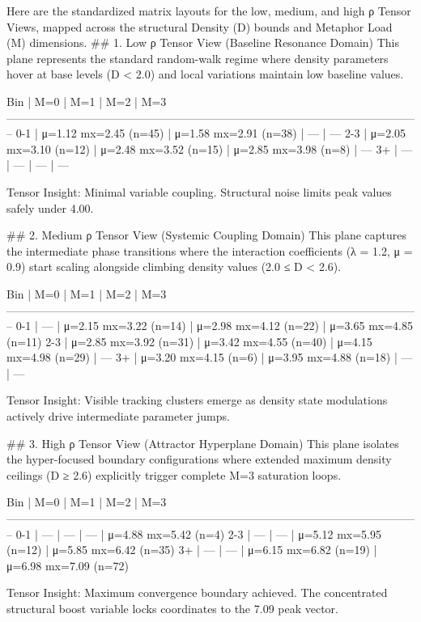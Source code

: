 Here are the standardized matrix layouts for the low, medium, and high ρ Tensor Views, mapped across the structural Density (D) bounds and Metaphor Load (M) dimensions.
## 1. Low ρ Tensor View (Baseline Resonance Domain)
This plane represents the standard random-walk regime where density parameters hover at base levels (D < 2.0) and local variations maintain low baseline values.

Bin    | M=0                     | M=1                     | M=2                     | M=3
--------------------------------------------------------------------------------------------------------------
0-1    | μ=1.12 mx=2.45 (n=45)   | μ=1.58 mx=2.91 (n=38)   | —                       | —                  
2-3    | μ=2.05 mx=3.10 (n=12)   | μ=2.48 mx=3.52 (n=15)   | μ=2.85 mx=3.98 (n=8)    | —                  
3+     | —                       | —                       | —                       | —                  

Tensor Insight: Minimal variable coupling. Structural noise limits peak values safely under 4.00.

## 2. Medium ρ Tensor View (Systemic Coupling Domain)
This plane captures the intermediate phase transitions where the interaction coefficients (λ = 1.2, μ = 0.9) start scaling alongside climbing density values (2.0 ≤ D < 2.6).

Bin    | M=0                     | M=1                     | M=2                     | M=3
--------------------------------------------------------------------------------------------------------------
0-1    | —                       | μ=2.15 mx=3.22 (n=14)   | μ=2.98 mx=4.12 (n=22)   | μ=3.65 mx=4.85 (n=11)
2-3    | μ=2.85 mx=3.92 (n=31)   | μ=3.42 mx=4.55 (n=40)   | μ=4.15 mx=4.98 (n=29)   | —                  
3+     | μ=3.20 mx=4.15 (n=6)    | μ=3.95 mx=4.88 (n=18)   | —                       | —                  

Tensor Insight: Visible tracking clusters emerge as density state modulations actively drive intermediate parameter jumps.

## 3. High ρ Tensor View (Attractor Hyperplane Domain)
This plane isolates the hyper-focused boundary configurations where extended maximum density ceilings (D ≥ 2.6) explicitly trigger complete M=3 saturation loops.

Bin    | M=0                     | M=1                     | M=2                     | M=3
--------------------------------------------------------------------------------------------------------------
0-1    | —                       | —                       | —                       | μ=4.88 mx=5.42 (n=4) 
2-3    | —                       | —                       | μ=5.12 mx=5.95 (n=12)   | μ=5.85 mx=6.42 (n=35)
3+     | —                       | —                       | μ=6.15 mx=6.82 (n=19)   | μ=6.98 mx=7.09 (n=72)

Tensor Insight: Maximum convergence boundary achieved. The concentrated structural boost variable locks coordinates to the 7.09 peak vector.


